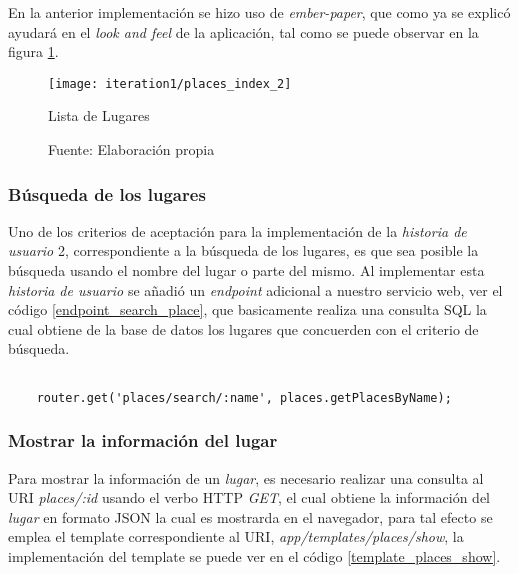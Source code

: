 En la anterior implementación se hizo uso de \emph{ember-paper}, que como ya se explicó ayudará en el \emph{look and feel} de la aplicación, tal como se puede observar en la figura \ref{fig:places_index}. \\


\begin{figure}[H]
  \begin{center}
    \texttt{[image: iteration1/places\_index\_2]}
    \caption{Lista de Lugares}
    \label{fig:places_index}
    \caption*{Fuente: Elaboración propia}
  \end{center}
\end{figure}


\subsubsection{Búsqueda de los lugares}
\label{subs:busqueda de los lugares}

Uno de los criterios de aceptación para la implementación de la \emph{historia de usuario} 2, correspondiente a la búsqueda de los lugares, es que sea posible la búsqueda usando el nombre del lugar o parte del mismo. Al implementar esta \emph{historia de usuario} se a\~nadi\'o un \emph{endpoint} adicional a nuestro servicio web, ver el código \ref{endpoint_search_place}, que basicamente realiza una consulta SQL la cual obtiene de la base de datos los lugares que concuerden con el criterio de búsqueda. \\

\begin{center}
  \begin{lstlisting}[label=endpoint_search_place,caption=Implementación de la búsqueda de lugares en el Servicio Web]

    router.get('places/search/:name', places.getPlacesByName);

  \end{lstlisting}
\end{center}


\subsubsection{Mostrar la información del lugar}
\label{subs:Mostrar información del lugar}

Para mostrar la información de un \emph{lugar}, es necesario realizar una consulta al URI \emph{places/:id} usando el verbo HTTP \emph{GET}, el cual obtiene la información del \emph{lugar} en formato JSON la cual es mostrarda en el navegador, para tal efecto se emplea el template correspondiente al URI,  \emph{app/templates/places/show}, la implementación del template se puede ver en el código \ref{template_places_show}. \\

